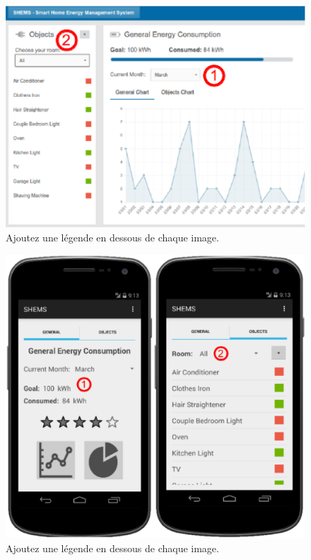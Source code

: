 \documentclass{chi-ext}
\begin{document}
\begin{figure}
  \centering
  \includegraphics[width=\linewidth]{images/web0_goal-filter.eps}
  \caption{Ajoutez une légende en dessous de chaque image.}
  \label{fig:sample}
\end{figure}

\begin{figure}
  \centering
  \includegraphics[width=\linewidth]{images/mobile_goal-filter.eps}
  \caption{Ajoutez une légende en dessous de chaque image.}
  \label{fig:sample}
\end{figure}
\end{document}
